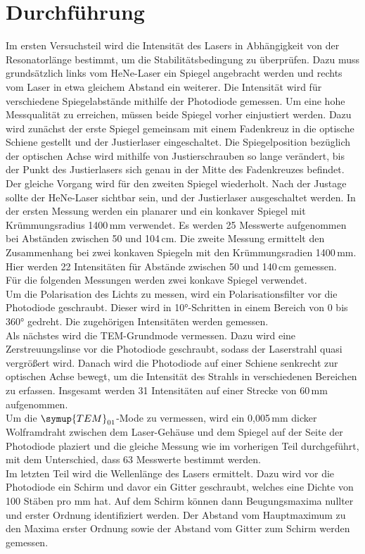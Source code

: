 \section{Durchführung}
\label{sec:Durchführung}

    Im ersten Versuchsteil wird die Intensität des Lasers in Abhängigkeit von der Resonatorlänge bestimmt,
    um die Stabilitätsbedingung zu überprüfen.
    Dazu muss grundsätzlich links vom HeNe-Laser ein Spiegel angebracht werden und rechts vom Laser in
    etwa gleichem Abstand ein weiterer. Die Intensität wird für verschiedene Spiegelabstände mithilfe der
    Photodiode gemessen. Um eine hohe Messqualität zu erreichen, müssen beide Spiegel vorher einjustiert werden.
    Dazu wird zunächst der erste Spiegel gemeinsam mit einem Fadenkreuz in die optische Schiene gestellt und
    der Justierlaser eingeschaltet.
    Die Spiegelposition bezüglich der optischen Achse wird mithilfe von Justierschrauben so lange verändert,
    bis der Punkt des Justierlasers sich genau in der Mitte des Fadenkreuzes befindet.
    Der gleiche Vorgang wird für den zweiten Spiegel wiederholt.
    Nach der Justage sollte der HeNe-Laser sichtbar sein, und der Justierlaser ausgeschaltet werden. %
    In der ersten Messung werden ein planarer und ein konkaver Spiegel mit Krümmungsradius 1400\,mm
    verwendet. Es werden 25 Messwerte aufgenommen bei Abständen zwischen 50 und 104\,cm.
    Die zweite Messung ermittelt den Zusammenhang bei zwei konkaven Spiegeln mit den Krümmungsradien 1400\,mm.
    Hier werden 22 Intensitäten für Abstände zwischen 50 und 140\,cm gemessen.\\
    Für die folgenden Messungen werden zwei konkave Spiegel verwendet.\\
    Um die Polarisation des Lichts zu messen, wird ein Polarisationsfilter vor die Photodiode geschraubt.
    Dieser wird in 10°-Schritten in einem Bereich von 0 bis 360° gedreht. Die zugehörigen Intensitäten werden gemessen. \\
    Als nächstes wird die TEM-Grundmode vermessen. Dazu wird eine Zerstreuungslinse vor die Photodiode geschraubt, sodass
    der Laserstrahl quasi vergrößert wird. Danach wird die Photodiode auf einer Schiene senkrecht zur optischen Achse
    bewegt, um die Intensität des Strahls in verschiedenen Bereichen zu erfassen. Insgesamt werden 31 Intensitäten auf einer
    Strecke von 60\,mm aufgenommen. \\
    Um die $\symup{TEM}_{01}$-Mode zu vermessen, wird ein 0,005\,mm dicker Wolframdraht zwischen dem Laser-Gehäuse und dem Spiegel
    auf der Seite der Photodiode
    plaziert und die gleiche Messung wie im vorherigen Teil durchgeführt, mit dem Unterschied, dass 63 Messwerte bestimmt werden. \\
    Im letzten Teil wird die Wellenlänge des Lasers ermittelt. Dazu wird vor die Photodiode ein Schirm und davor ein Gitter geschraubt,
    welches eine Dichte von 100 Stäben pro mm hat.
    Auf dem Schirm können dann Beugungsmaxima nullter und erster Ordnung identifiziert werden. Der Abstand
    vom Hauptmaximum zu den Maxima erster Ordnung sowie der Abstand vom Gitter zum Schirm werden gemessen.\\
